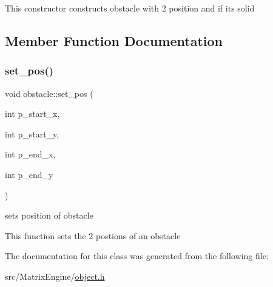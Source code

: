 This constructor constructs obstacle with 2 position and if it\textquotesingle{}s solid 

\subsection{Member Function Documentation}
\mbox{\label{classobstacle_af6a9bc32f4999fd9109eda04febdae40}} 
\subsubsection{\texorpdfstring{set\+\_\+pos()}{set\_pos()}}
{\footnotesize\ttfamily void obstacle\+::set\+\_\+pos (\begin{DoxyParamCaption}\item[{int}]{p\+\_\+start\+\_\+x,  }\item[{int}]{p\+\_\+start\+\_\+y,  }\item[{int}]{p\+\_\+end\+\_\+x,  }\item[{int}]{p\+\_\+end\+\_\+y }\end{DoxyParamCaption})\hspace{0.3cm}{\ttfamily [inline]}}



sets position of obstacle 

This function sets the 2 postions of an obstacle 

The documentation for this class was generated from the following file\+:\begin{DoxyCompactItemize}
\item 
src/\+Matrix\+Engine/\hyperlink{object_8h}{object.\+h}\end{DoxyCompactItemize}
